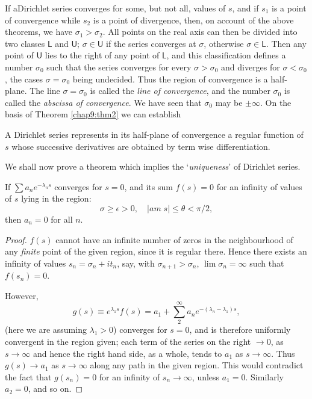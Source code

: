 If a\pageoriginale Dirichlet series converges for some, but not all,
values of $s$, and if $s_1$ is a point of convergence while $s_2$ is a
point of divergence, then, on account of the above theorems, we have
$\sigma_1 > \sigma_2$. All points on the real axis can then be divided
into two classes $\mathsf{L}$ and $\mathsf{U}$; $\sigma \in
\mathsf{U}$ if the series converges at $\sigma$, otherwise $\sigma
\in \mathsf{L}$. Then any point of $\mathsf{U}$ lies to the
right of any point of $\mathsf{L}$, and this classification defines a
number $\sigma_0$ such that the series converges for every $\sigma >
\sigma_0$ and diverges for $\sigma < \sigma_0$, the cases $\sigma =
\sigma_0$ being undecided. Thus the region of convergence is a
half-plane. The line $\sigma=\sigma_0$ is called the \textit{line of
  convergence}, and the number $\sigma_0$ is called the
\textit{abscissa of convergence}. We have seen that $\sigma_0$ may be
$\pm \infty$. On the basis of Theorem \ref{chap9:thm2} we can establish

\begin{thm}\label{chap9:thm4}
A Dirichlet series represents in its half-plane of convergence a
regular function of $s$ whose successive derivatives are obtained by
term wise differentiation.
\end{thm}

We shall now prove a theorem which implies the `\textit{uniqueness}'
of Dirichlet series.

\begin{thm}\label{chap9:thm5}
If $\sum a_n e^{-\lambda_ns}$ converges for $s=0$, and its sum
$f(s)=0$ for an infinity of values of $s$ lying in the region:
$$
\sigma \geq \epsilon >0, \quad |am \; s| \leq \theta < \pi/2, 
$$
then $a_n = 0$ for all $n$.
\end{thm}

\begin{proof}
$f(s)$ cannot have an infinite number of zeros in the neighbourhood of
  any \textit{finite} point of the given region, since it is regular
  there. Hence there exists an infinity of values 
$s_n = \sigma_n + it_n$, say, with $\sigma_{n+1} > \sigma_n$, $\lim
 \sigma_n = \infty$ such that $f(s_n) = 0$.

However,\pageoriginale
$$
g(s) \equiv e^{\lambda_1s} f(s) = a_1 + \sum\limits^\infty_2 a_n
e^{-(\lambda_n - \lambda_1) s},
$$
(here we are assuming $\lambda_1 > 0$) converges for $s=0$, and is
therefore uniformly convergent in the region given; each term of the
series on the right $\to 0$, as $s \to \infty$ and hence the right
hand side, as a whole, tends to $a_1$ as $s \to \infty$. Thus $g(s)
\to a_1$ as $s \to \infty$ along any path in the given region. This
would contradict the fact that $g(s_n)=0$ for an infinity of $s_n \to
\infty$, unless $a_1=0$. Similarly $a_2 = 0$, and so on.
\end{proof}

